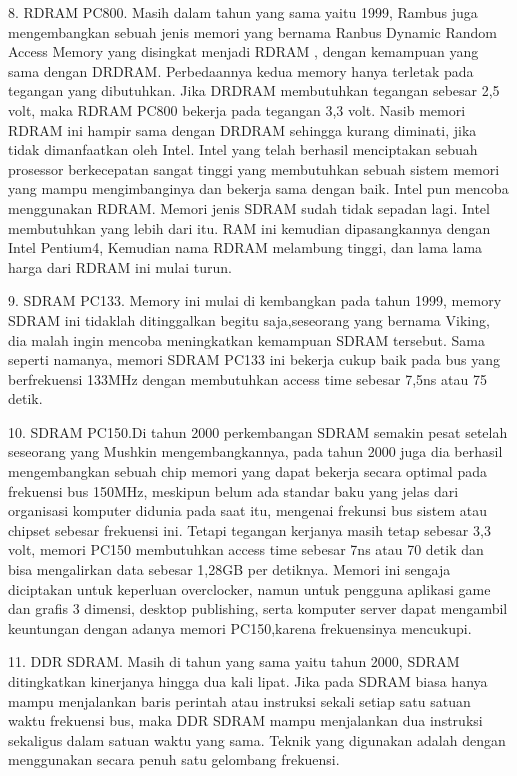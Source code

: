 8.  RDRAM PC800. Masih dalam tahun yang sama yaitu 1999, Rambus juga mengembangkan sebuah jenis memori yang bernama Ranbus Dynamic Random Access Memory yang disingkat menjadi RDRAM , dengan kemampuan yang sama dengan DRDRAM. Perbedaannya kedua memory hanya terletak pada tegangan yang dibutuhkan. Jika DRDRAM membutuhkan tegangan sebesar 2,5 volt, maka RDRAM PC800 bekerja pada tegangan 3,3 volt. Nasib memori RDRAM ini hampir sama dengan DRDRAM sehingga kurang diminati, jika tidak dimanfaatkan oleh Intel. Intel yang telah berhasil menciptakan sebuah prosessor berkecepatan sangat tinggi yang membutuhkan sebuah sistem memori yang mampu mengimbanginya dan bekerja sama dengan baik. Intel pun mencoba menggunakan RDRAM. Memori jenis SDRAM sudah tidak sepadan lagi. Intel membutuhkan yang lebih dari itu. RAM ini kemudian dipasangkannya dengan Intel Pentium4, Kemudian nama RDRAM melambung tinggi, dan lama \- lama harga dari RDRAM ini mulai turun.

9.  SDRAM PC133. Memory ini mulai di kembangkan pada tahun 1999, memory SDRAM ini tidaklah ditinggalkan begitu saja,seseorang yang bernama Viking, dia malah ingin mencoba meningkatkan kemampuan SDRAM tersebut. Sama seperti namanya, memori SDRAM PC133 ini bekerja cukup baik pada bus yang berfrekuensi 133MHz dengan membutuhkan access time sebesar 7,5ns atau 75 detik.

10. SDRAM PC150.Di tahun 2000 perkembangan SDRAM semakin pesat setelah seseorang yang Mushkin mengembangkannya, pada tahun 2000 juga dia berhasil mengembangkan sebuah chip memori yang dapat bekerja secara optimal pada frekuensi bus 150MHz, meskipun belum ada standar baku yang jelas dari organisasi komputer didunia pada saat itu, mengenai frekunsi bus sistem atau chipset sebesar frekuensi ini. Tetapi tegangan kerjanya masih tetap sebesar 3,3 volt, memori PC150 membutuhkan access time sebesar 7ns atau 70 detik dan bisa mengalirkan data sebesar 1,28GB per detiknya. Memori ini sengaja diciptakan untuk keperluan overclocker, namun untuk pengguna aplikasi game dan grafis 3 dimensi, desktop publishing, serta komputer server dapat mengambil keuntungan dengan adanya memori PC150,karena frekuensinya mencukupi.

11. DDR SDRAM. Masih di tahun yang sama yaitu tahun 2000, SDRAM ditingkatkan kinerjanya hingga dua kali lipat. Jika pada SDRAM biasa hanya mampu menjalankan baris perintah atau instruksi sekali setiap satu satuan waktu frekuensi bus, maka DDR SDRAM mampu menjalankan dua instruksi sekaligus dalam satuan waktu yang sama. Teknik yang digunakan adalah dengan menggunakan secara penuh satu gelombang frekuensi.

